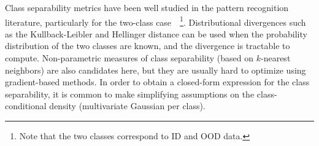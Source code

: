 Class separability metrics have been well studied in the pattern recognition literature, particularly for the two-class case~\cite{fukunaga1990separ}~\footnote{Note that the two classes correspond to ID and OOD data.}. 
Distributional divergences such as the Kullback-Leibler and Hellinger distance can be used when the probability distribution of the two classes are known, and the divergence is tractable to compute.
Non-parametric measures of class separability (\eg based on $k$-nearest neighbors) are also candidates here, but they are usually hard to optimize using gradient-based methods.
In order to obtain a closed-form expression for the class separability, it is common to make simplifying assumptions on the class-conditional density (\eg multivariate Gaussian per class).

